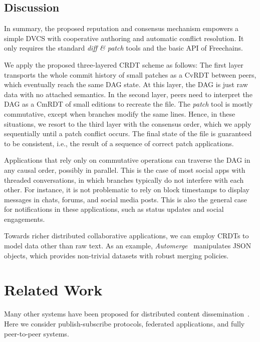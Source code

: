 \documentclass[10pt,journal,compsoc]{IEEEtran}
\newcommand{\FC}       {Freechains\xspace}
\begin{document}
\subsection{Discussion}

In summary, the proposed reputation and consensus mechanism empowers a simple
DVCS with cooperative authoring and automatic conflict resolution.
It only requires the standard \emph{diff \& patch} tools and the basic API of
\FC.

We apply the proposed three-layered CRDT scheme as follows:
The first layer transports the whole commit history of small patches as a CvRDT
between peers, which eventually reach the same DAG state.
At this layer, the DAG is just raw data with no attached semantics.
%
In the second layer, peers need to interpret the DAG as a CmRDT of small
editions to recreate the file.
The \emph{patch} tool is mostly commutative, except when branches modify the
same lines.
%
Hence, in these situations, we resort to the third layer with the consensus
order, which we apply sequentially until a patch conflict occurs.
The final state of the file is guaranteed to be consistent, i.e., the result of
a sequence of correct patch applications.

Applications that rely only on commutative operations can traverse the DAG in
any causal order, possibly in parallel.
This is the case of most social apps with threaded conversations, in which
branches typically do not interfere with each other.
For instance, it is not problematic to rely on block timestamps to display
messages in chats, forums, and social media posts.
This is also the general case for notifications in these applications, such as
status updates and social engagements.

Towards richer distributed collaborative applications, we can employ CRDTs to
model data other than raw text.
As an example, \emph{Automerge}~\cite{p2p.automerge} manipulates JSON objects,
which provides non-trivial datasets with robust merging policies.

\section{Related Work}
\label{sec.related}


Many other systems have been proposed for distributed content
dissemination~\cite{p2p.survey,p2p.ecosystem}.
Here we consider publish-subscribe protocols, federated applications, and fully
peer-to-peer systems.
\end{document}

